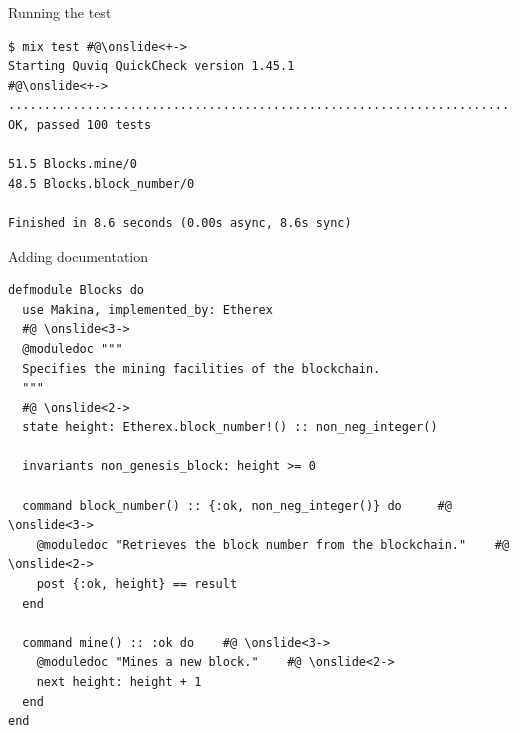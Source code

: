 \documentclass[aspectratio=169, 10pt]{beamer}
\begin{document}
\begin{frame}[label={sec:org721715b},fragile]{Running the test}
 \onslide<+->
\onslide<+->
\lstset{language=bash,label= ,caption= ,captionpos=b,numbers=none,style=shell}
\begin{lstlisting}
$ mix test #@\onslide<+->
Starting Quviq QuickCheck version 1.45.1
#@\onslide<+->
....................................................................................................
OK, passed 100 tests

51.5 Blocks.mine/0
48.5 Blocks.block_number/0

Finished in 8.6 seconds (0.00s async, 8.6s sync)
\end{lstlisting}
\end{frame}

\begin{frame}[label={sec:org9852408},fragile]{Adding documentation}
 \onslide<+->
\onslide<+->
\lstset{language=elixir,label= ,caption= ,captionpos=b,numbers=none,style=display}
\begin{lstlisting}
defmodule Blocks do
  use Makina, implemented_by: Etherex
  #@ \onslide<3->
  @moduledoc """
  Specifies the mining facilities of the blockchain.
  """
  #@ \onslide<2->
  state height: Etherex.block_number!() :: non_neg_integer()

  invariants non_genesis_block: height >= 0

  command block_number() :: {:ok, non_neg_integer()} do     #@ \onslide<3->
    @moduledoc "Retrieves the block number from the blockchain."    #@ \onslide<2->
    post {:ok, height} == result
  end

  command mine() :: :ok do    #@ \onslide<3->
    @moduledoc "Mines a new block."    #@ \onslide<2->
    next height: height + 1
  end
end
\end{lstlisting}
\end{frame}
\end{document}
